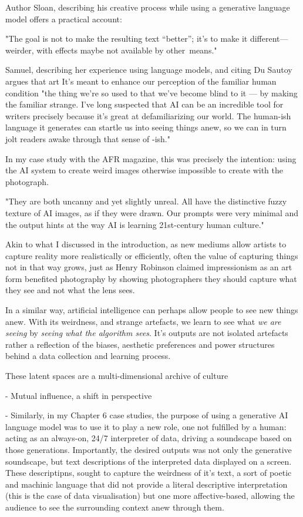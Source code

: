 Author Sloan, describing his creative process while using a generative language model offers a practical account:

 "The goal is not to make the resulting text “better”; it’s to make it different—weirder, with effects maybe not available by other means."



Samuel, describing her experience using language models, and citing Du Sautoy argues that art It’s meant to enhance our perception of the familiar human condition  "the thing we’re so used to that we’ve become blind to it — by making the familiar strange.
I’ve long suspected that AI can be an incredible tool for writers precisely because it’s great at defamiliarizing our world. The human-ish language it generates can startle us into seeing things anew, so we can in turn jolt readers awake through that sense of -ish."




In my case study with the AFR magazine, this was precisely the intention: using the AI system to create weird images otherwise impossible to create with the photograph. 


 "They are both uncanny and yet slightly unreal. All have the distinctive fuzzy texture of AI images, as if they were drawn. Our prompts were very minimal and the output hints at the way AI is learning 21st-century human culture."

Akin to what I discussed in the introduction, as new mediums allow artists to capture reality more realistically or efficiently, often the value of capturing things not in that way grows, just as Henry Robinson claimed impressionism as an art form benefited photography by showing photographers they should capture what they see and not what the lens sees. 

In a similar way, artificial intelligence can perhaps allow people to see new things anew. With its weirdness, and strange artefacts, we learn to see what \textit{we are seeing} by \textit{seeing what the algorithm sees}. It's outputs are not isolated artefacts rather a reflection of the biases, aesthetic preferences and power structures behind a data collection and learning process. 

These latent spaces are a multi-dimensional archive of culture \cite{Schaerf2024-gf, Cetinic2022-tw, Rodriguez-Ortega2022-ak, Salvaggio2023-cv}

- Mutual influence, a shift in perspective

- Similarly, in my Chapter 6 case studies, the purpose of using a generative AI language model was to use it to play a new role, one not fulfilled by a human: acting as an always-on, 24/7 interpreter of data, driving a soundscape based on those generations. Importantly, the desired outputs was not only the generative soundscape, but text descriptions of the interpreted data displayed on a screen. These descriptipns, sought to capture the weirdness of it's text, a sort of poetic and machinic language that did not provide a literal descriptive interpretation (this is the case of data visualisation) but one more affective-based, allowing the audience to see the surrounding context anew through them. 





